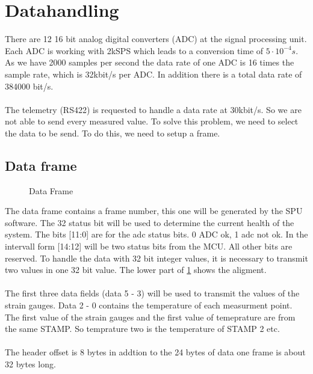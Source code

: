 \section{Datahandling}
There are 12 16 bit analog digital converters (ADC) at the signal processing unit. 
Each ADC is working with 2kSPS which leads to a conversion time of $5 \cdot 10^{-4}s$. As we have 2000 samples per second the data rate of one ADC is 16 times the sample rate, which is 32kbit/s per ADC. In addition there is a total data rate of 384000 bit/s.  \\ \\
The telemetry (RS422) is requested to handle a data rate at 30kbit/s. So we are not able to send every measured value. 
To solve this problem, we  need to select the data to be send. To do this, we need to setup a frame. 
\subsection{Data frame}
\begin{figure}[htb]
	\centering
	\caption{Data Frame} \label{fig:sp-experimentOverview}
\end{figure} \noindent
The data frame contains a frame number, this one will be generated by the SPU software. The 32 status bit will be used to determine the current health of the system. The bits [11:0] are for the adc status bits. 0 ADC ok, 1 adc not ok. In the intervall form [14:12] will be two status bits from the MCU. All other bits are reserved. 
To handle the data with 32 bit integer values, it is necessary to transmit two values in one 32 bit value. The lower part of \ref{fig:sp-experimentOverview} shows the aligment.  \\ \\
The first three data fields (data 5 - 3) will be used to transmit the values of the strain gauges. Data 2 - 0 contains the temperature of each measurment point. The first value of the strain gauges and the first value of temeprature are from the same STAMP. So temprature two is the temperature of STAMP 2 etc.\\ \\
The header offset is 8 bytes in addtion to the 24 bytes of data one frame is about 32 bytes long. 
